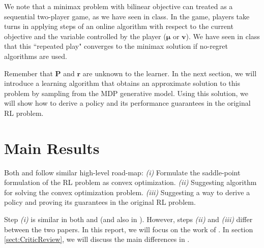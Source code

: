 \documentclass{article}
\newtheorem{remark}{Remark}
\newcommand{\ra}[1]{\textcolor{blue}{\{Ron: #1\}}}
\DeclarePairedDelimiter\abs{\lvert}{\rvert}%
\newcommand{\States}{\mathcal{S}}
\newcommand{\Actions}{\mathcal{A}}
\newcommand{\nSt}{{\abs{\States}}}
\newcommand{\nAct}{{\abs{\Actions}}}
\newcommand{\Pb}{\boldsymbol{P}}
\newcommand{\rb}{\boldsymbol{r}}
\newcommand{\vb}{\boldsymbol{v}}
\newcommand{\mub}{\boldsymbol{\mu}}
\begin{document}
We note that a minimax problem with bilinear objective can treated as a sequential two-player game, as we have seen in class.
In the game, players take turns in applying steps of an online algorithm with respect to the current objective and the variable controlled by the player ($\mub$ or $\vb$). We have seen in class that this ``repeated play" converges to the minimax solution if no-regret algorithms are used.

Remember that $\Pb$ and $\rb$ are unknown to the learner.
In the next section, we will introduce a learning algorithm that obtains an approximate solution to this problem by sampling from the MDP generative model.
Using this solution, we will show how to derive a policy and its performance guarantees in the original RL problem.


\section{Main Results}


Both \citet{jin20efficiently} and \citet{cheng2020reduction} follow similar high-level road-map:
\textit{(i)} Formulate the saddle-point formulation of the RL problem as convex optimization.
\textit{(ii)} Suggesting algorithm for solving the convex optimization problem.
\textit{(iii)} Suggesting a way to derive a policy and proving its guarantees in the original RL problem.

Step \textit{(i)} is similar in both \citet{jin20efficiently} and \citet{cheng2020reduction} (and also in \citet{wang2017randomized}).
However, steps  \textit{(ii)}  and  \textit{(iii)} differ between the two papers.
In this report, we will focus on the work of \citet{jin20efficiently}. In section \ref{sect:CriticReview}, we will discuss the main differences in \citet{cheng2020reduction}.
\end{document}
